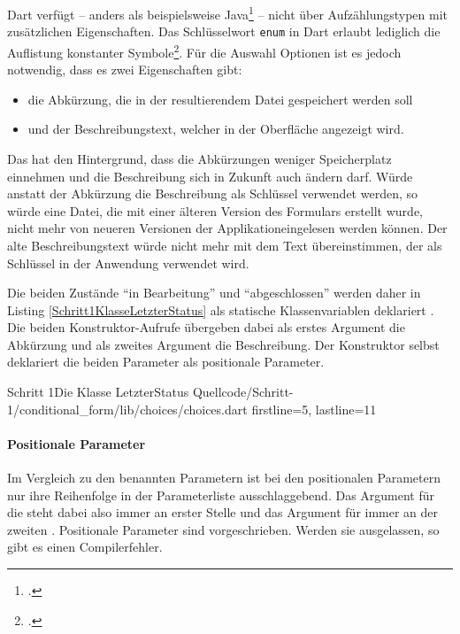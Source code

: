 Dart verfügt – anders als beispielsweise Java\footcite[Vgl.][S. 321]{TheJavaLanguageSpecificationJavaSE16Edition} – nicht über Aufzählungstypen mit zusätzlichen Eigenschaften. Das Schlüsselwort \texttt{enum} in Dart erlaubt lediglich die Auflistung konstanter Symbole\footcite[Vgl.][S. 74f.]{DartProgrammingLanguageSpecification5thedition}. Für die Auswahl Optionen ist es jedoch notwendig, dass es zwei Eigenschaften gibt:
\begin{itemize}
  \parsep 0pt
  \topsep 0pt
  \itemsep 0pt 

  \item die Abkürzung, die in der resultierendem Datei gespeichert werden soll
  \item und der Beschreibungstext, welcher in der Oberfläche angezeigt wird.
\end{itemize}
Das hat den Hintergrund, dass die Abkürzungen weniger Speicherplatz einnehmen und die Beschreibung sich in Zukunft auch ändern darf. Würde anstatt der Abkürzung die Beschreibung als Schlüssel verwendet werden, so würde eine Datei, die mit einer älteren Version des Formulars erstellt wurde, nicht mehr von neueren Versionen der Applikationeingelesen werden können. Der alte Beschreibungstext würde nicht mehr mit dem Text übereinstimmen, der als Schlüssel in der Anwendung verwendet wird. 


Die beiden Zustände \enquote{in Bearbeitung} und \enquote{abgeschlossen} werden daher in Listing \ref{Schritt1KlasseLetzterStatus} als statische Klassenvariablen deklariert . Die beiden Konstruktor-Aufrufe übergeben dabei als erstes Argument die Abkürzung und als zweites Argument die Beschreibung. Der Konstruktor selbst  deklariert die beiden Parameter als positionale Parameter.

\begin{alexlisting}{Schritt 1}{Die Klasse LetzterStatus}
  {Quellcode/Schritt-1/conditional_form/lib/choices/choices.dart}
  {firstline=5, lastline=11}
  \label{lst:Schritt1KlasseLetzterStatus}
\end{alexlisting}

\paragraph{Positionale Parameter}

Im Vergleich zu den benannten Parametern ist bei den positionalen Parametern nur ihre Reihenfolge in der Parameterliste ausschlaggebend. Das Argument für die  steht dabei also immer an erster Stelle und das Argument für  immer an der zweiten . Positionale Parameter sind vorgeschrieben. Werden sie ausgelassen, so gibt es einen Compilerfehler. 

